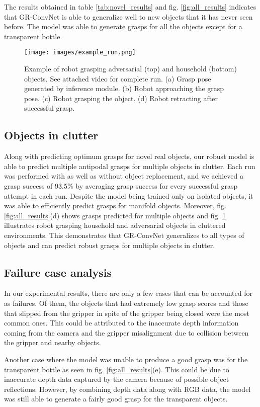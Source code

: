 \documentclass[letterpaper, 10 pt, conference]{ieeeconf}
\begin{document}
The results obtained in table \ref{tab:novel_results} and fig. \ref{fig:all_results} indicates that GR-ConvNet is able to generalize well to new objects that it has never seen before. The model was able to generate grasps for all the objects except for a transparent bottle.

\begin{figure}
    \centering
    \texttt{[image: images/example\_run.png]}
    \caption{Example of robot grasping adversarial (top) and household (bottom) objects. See attached video for complete run. (a) Grasp pose generated by inference module. (b) Robot approaching the grasp pose. (c) Robot grasping the object. (d) Robot retracting after successful grasp.}
    \label{fig: example_run}
\end{figure}


\subsection{Objects in clutter}
Along with predicting optimum grasps for novel real objects, our robust model is able to predict multiple antipodal grasps for multiple objects in clutter. Each run was performed with as well as without object replacement, and we achieved a grasp success of 93.5\% by averaging grasp success for every successful grasp attempt in each run. Despite the model being trained only on isolated objects, it was able to efficiently predict grasps for manifold objects. Moreover, fig. \ref{fig:all_results}(d) shows grasps predicted for multiple objects and fig. \ref{fig: example_run} illustrates robot grasping household and adversarial objects in cluttered environments. This demonstrates that GR-ConvNet generalizes to all types of objects and can predict robust grasps for multiple objects in clutter. 

\subsection{Failure case analysis}
In our experimental results, there are only a few cases that can be accounted for as failures. Of them, the objects that had extremely low grasp scores and those that slipped from the gripper in spite of the gripper being closed were the most common ones. This could be attributed to the inaccurate depth information coming from the camera and the gripper misalignment due to collision between the gripper and nearby objects.

Another case where the model was unable to produce a good grasp was for the transparent bottle as seen in fig. \ref{fig:all_results}(e). This could be due to inaccurate depth data captured by the camera because of possible object reflections. However, by combining depth data along with RGB data, the model was still able to generate a fairly good grasp for the transparent objects.
\end{document}
